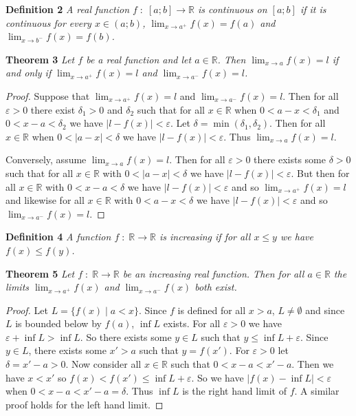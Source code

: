 \documentclass{article}
\begin{document}
\begin{flushleft}
\textbf{Definition 2}
\textsl{A real function $f \; : \; [a;b] \rightarrow \mathbb{R}$ is continuous on $[a;b]$ if it is continuous for every $x \in (a;b)$, $\lim_{x \rightarrow a^+} f(x) = f(a)$ and $\lim_{x \rightarrow b^-} f(x) = f(b)$.}\newline

\textbf{Theorem 3}
\textsl{Let $f$ be a real function and let $a \in \mathbb{R}$. Then $\lim_{x \rightarrow a} f(x) = l$ if and only if $\lim_{x \rightarrow a^+} f(x) = l$ and $\lim_{x \rightarrow a^-} f(x) = l$.}
\begin{proof}
Suppose that $\lim_{x \rightarrow a^+} f(x) = l$ and $\lim_{x \rightarrow a^-} f(x) = l$. Then for all $\varepsilon > 0$ there exist $\delta_1 > 0$ and $\delta_2$ such that for all $x \in \mathbb{R}$ when $0 < a - x < \delta_1$ and $0 < x - a < \delta_2$ we have $|l - f(x)| < \varepsilon$. Let $\delta = \min (\delta_1 , \delta_2)$. Then for all $x \in \mathbb{R}$ when $0 < |a-x| < \delta$ we have $|l - f(x)| < \varepsilon$. Thus $\lim_{x \rightarrow a} f(x) = l$.\newline

Conversely, assume $\lim_{x \rightarrow a} f(x) = l$. Then for all $\varepsilon > 0$ there exists some $\delta > 0$ such that for all $x \in \mathbb{R}$ with $0 < |a-x| < \delta$ we have $|l-f(x)| < \varepsilon$. But then for all $x \in \mathbb{R}$ with $0 < x - a < \delta$ we have $|l-f(x)| < \varepsilon$ and so $\lim_{x \rightarrow a^+} f(x) = l$ and likewise for all $x \in \mathbb{R}$ with $0 < a - x < \delta$ we have $|l-f(x)| < \varepsilon$ and so $\lim_{x \rightarrow a^-} f(x) = l$.
\end{proof}

\textbf{Definition 4}
\textsl{A function $f \; : \; \mathbb{R} \rightarrow \mathbb{R}$ is increasing if for all $x \leq y$ we have $f(x) \leq f(y)$.}\newline

\textbf{Theorem 5}
\textsl{Let $f \; : \; \mathbb{R} \rightarrow \mathbb{R}$ be an increasing real function. Then for all $a \in \mathbb{R}$ the limits $\lim_{x \rightarrow a^+} f(x)$ and $\lim_{x \rightarrow a^-} f(x)$ both exist.}
\begin{proof}
Let $L= \{f(x) \mid a < x\}$. Since $f$ is defined for all $x>a$, $L \neq \emptyset$ and since $L$ is bounded below by $f(a)$, $\inf L$ exists. For all $\varepsilon > 0$ we have $\varepsilon + \inf L > \inf L$. So there exists some $y \in L$ such that $y \leq \inf L + \varepsilon$. Since $y \in L$, there exists some $x' > a$ such that $y = f(x')$. For $\varepsilon > 0$ let $\delta = x' - a > 0$. Now consider all $x \in \mathbb{R}$ such that $0 < x-a < x' -a$. Then we have $x<x'$ so $f(x) < f(x') \leq \inf L + \varepsilon$. So we have $|f(x) - \inf L| < \varepsilon$ when $0 < x-a < x'-a = \delta$. Thus $\inf L$ is the right hand limit of $f$. A similar proof holds for the left hand limit.
\end{proof}


\end{flushleft}
\end{document}
